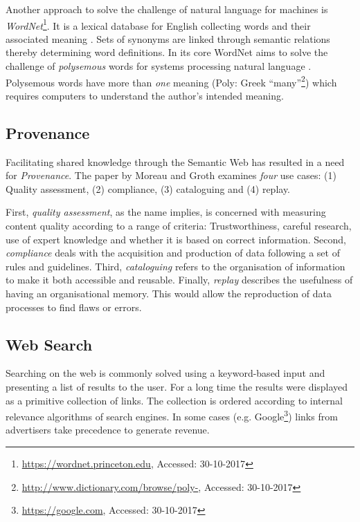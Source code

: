 Another approach to solve the challenge of natural language for machines is \textit{WordNet}\footnote{\url{https://wordnet.princeton.edu}, Accessed: 30-10-2017}.
It is a lexical database for English collecting words and their associated meaning \cite{Miller1995b}.
Sets of synonyms are linked through semantic relations thereby determining word definitions.
In its core WordNet aims to solve the challenge of \textit{polysemous} words for systems processing natural language \cite{Miller1995b}.
Polysemous words have more than \textit{one} meaning (Poly: Greek \enquote{many}\footnote{\url{http://www.dictionary.com/browse/poly-}, Accessed: 30-10-2017}) which requires computers to understand the author's intended meaning.

\subsection{Provenance}
Facilitating shared knowledge through the Semantic Web has resulted in a need for \textit{Provenance}.
The paper by Moreau and Groth \cite{Moreau2013b} examines \textit{four} use cases: (1) Quality assessment, (2) compliance, (3) cataloguing and (4) replay.

First, \textit{quality assessment}, as the name implies, is concerned with measuring content quality according to a range of criteria: Trustworthiness, careful research, use of expert knowledge and whether it is based on correct information.
Second, \textit{compliance} deals with the acquisition and production of data following a set of rules and guidelines.
Third, \textit{cataloguing} refers to the organisation of information to make it both accessible and reusable.
Finally, \textit{replay} describes the usefulness of having an organisational memory.
This would allow the reproduction of data processes to find flaws or errors.

\subsection{Web Search}
Searching on the web is commonly solved using a keyword-based input and presenting a list of results to the user.
For a long time the results were displayed as a primitive collection of links.
The collection is ordered according to internal relevance algorithms of search engines.
In some cases (e.g. Google\footnote{\url{https://google.com}, Accessed: 30-10-2017}) links from advertisers take precedence to generate revenue.

